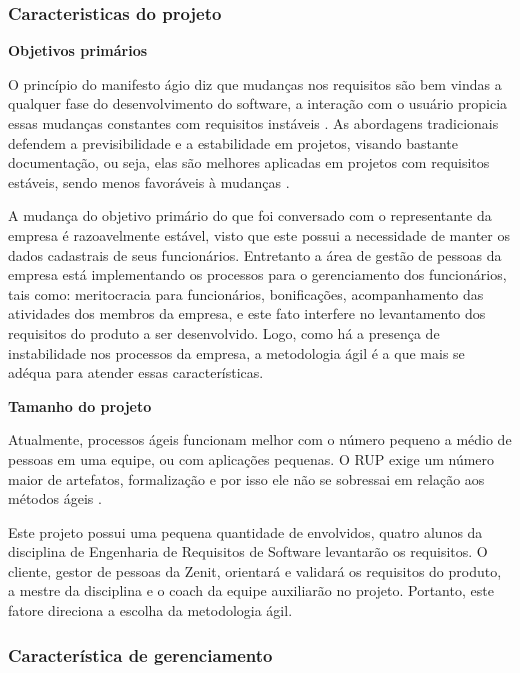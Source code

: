 \subsubsection{Caracteristicas do projeto}
\begin{description}
\item \textbf{Objetivos primários}

O princípio do manifesto ágio diz que mudanças nos requisitos são bem vindas a qualquer fase do desenvolvimento do software, a interação com o usuário propicia essas mudanças constantes com requisitos instáveis \cite{agileManifest}. As abordagens tradicionais defendem a previsibilidade e a estabilidade em projetos, visando bastante documentação, ou seja, elas são melhores aplicadas em projetos com requisitos estáveis, sendo menos favoráveis à mudanças  \cite{boehm2004}.

A mudança do objetivo primário do que foi conversado com o representante da empresa é razoavelmente estável, visto que este possui a necessidade de manter os dados cadastrais de seus funcionários. Entretanto a área de gestão de pessoas da empresa está implementando os processos para o gerenciamento dos funcionários, tais como: meritocracia para funcionários, bonificações, acompanhamento das atividades dos membros da empresa, e este fato interfere no levantamento dos requisitos do produto a ser desenvolvido. Logo, como há a presença de instabilidade nos processos da empresa, a metodologia ágil é a que mais se adéqua para atender essas características.

\item \textbf{Tamanho do projeto}

Atualmente, processos ágeis funcionam melhor com o número pequeno a médio de pessoas em uma equipe, ou com aplicações pequenas. O RUP exige um número maior de artefatos, formalização e por isso ele não se sobressai em relação aos métodos ágeis \cite{boehm2004}.

Este projeto possui uma pequena quantidade de envolvidos, quatro alunos da disciplina de Engenharia de Requisitos de Software levantarão os requisitos. O cliente, gestor de pessoas da Zenit, orientará e validará os requisitos do produto, a mestre da disciplina e o coach da equipe auxiliarão no projeto. Portanto, este fatore direciona a escolha da metodologia ágil.
\end{description}
\subsubsection{Característica de gerenciamento}

